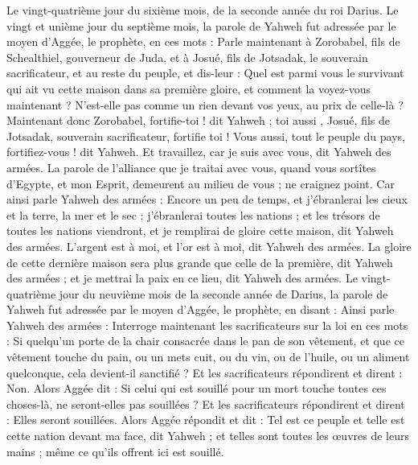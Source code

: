 \begin{multicols}{2}
Le vingt-quatrième jour du sixième mois, de la seconde année du roi Darius.
\VerseOne{}Le vingt et unième jour du septième mois, la parole de Yahweh fut adressée par le moyen d'Aggée, le prophète, en ces mots :
Parle maintenant à Zorobabel, fils de Schealthiel, gouverneur de Juda, et à Josué, fils de Jotsadak, le souverain sacrificateur, et au reste du peuple, et dis-leur :
Quel est parmi vous le survivant qui ait vu cette maison dans sa première gloire, et comment la voyez-vous maintenant ? N'est-elle pas comme un rien devant vos yeux, au prix de celle-là ?
Maintenant donc Zorobabel, fortifie-toi ! dit Yahweh ;  toi aussi , Josué, fils de Jotsadak, souverain sacrificateur, fortifie toi ! Vous aussi, tout le peuple du pays, fortifiez-vous ! dit Yahweh. Et travaillez, car je suis avec vous, dit Yahweh des armées.
La parole de l'alliance que je traitai avec vous, quand vous sortîtes d'Egypte, et mon Esprit, demeurent au milieu de vous ; ne craignez point.
Car ainsi parle Yahweh des armées : Encore un peu de temps, et j'ébranlerai les cieux et la terre, la mer et le sec ;
j'ébranlerai toutes les nations ; et les trésors de toutes les nations viendront, et je remplirai de gloire cette maison, dit Yahweh des armées.
L'argent est à moi, et l'or est à moi, dit Yahweh des armées.
La gloire de cette dernière maison sera plus grande que celle de la première, dit Yahweh des armées ; et je mettrai la paix en ce lieu, dit Yahweh des armées.
Le vingt-quatrième jour du neuvième mois de la seconde année de Darius, la parole de Yahweh fut adressée par le moyen d'Aggée, le prophète, en disant :
Ainsi parle Yahweh des armées : Interroge maintenant les sacrificateurs sur la loi en ces mots :
Si quelqu'un porte de la chair consacrée dans le pan de son vêtement, et que ce vêtement touche du pain, ou un mets cuit, ou du vin, ou de l'huile, ou un aliment quelconque, cela devient-il sanctifié ? Et les sacrificateurs répondirent et dirent : Non.
Alors Aggée dit : Si celui qui est souillé pour un mort touche toutes ces choses-là, ne seront-elles pas souillées ? Et les sacrificateurs répondirent et dirent : Elles seront souillées.
Alors Aggée répondit et dit : Tel est ce peuple et telle est cette nation devant ma face, dit Yahweh ; et telles sont toutes les œuvres de leurs mains ; même ce qu'ils offrent ici est souillé.

\end{multicols}
